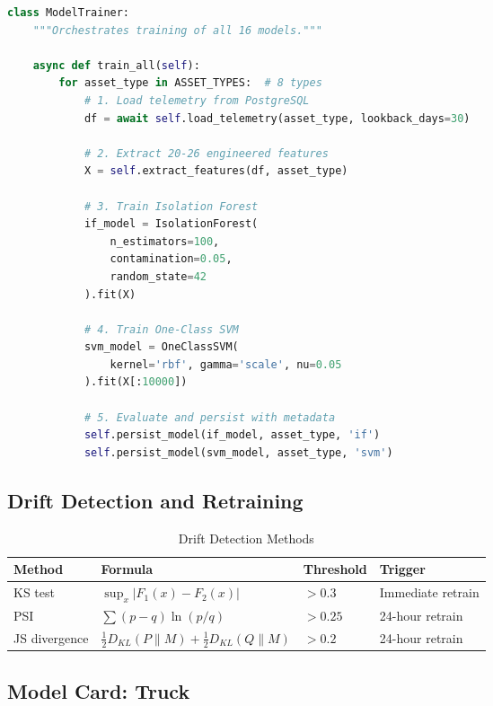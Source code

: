 \documentclass[12pt,a4paper]{amritareport}
\begin{document}
\begin{lstlisting}[language=Python, caption={ML training pipeline}]
class ModelTrainer:
    """Orchestrates training of all 16 models."""

    async def train_all(self):
        for asset_type in ASSET_TYPES:  # 8 types
            # 1. Load telemetry from PostgreSQL
            df = await self.load_telemetry(asset_type, lookback_days=30)

            # 2. Extract 20-26 engineered features
            X = self.extract_features(df, asset_type)

            # 3. Train Isolation Forest
            if_model = IsolationForest(
                n_estimators=100,
                contamination=0.05,
                random_state=42
            ).fit(X)

            # 4. Train One-Class SVM
            svm_model = OneClassSVM(
                kernel='rbf', gamma='scale', nu=0.05
            ).fit(X[:10000])

            # 5. Evaluate and persist with metadata
            self.persist_model(if_model, asset_type, 'if')
            self.persist_model(svm_model, asset_type, 'svm')
\end{lstlisting}

\subsection{Drift Detection and Retraining}

\begin{table}[H]
\centering
\caption{Drift Detection Methods}
\label{tab:drift}
\begin{tabular}{@{}llll@{}}
\toprule
\textbf{Method} & \textbf{Formula} & \textbf{Threshold} & \textbf{Trigger} \\
\midrule
KS test & $\sup_x |F_1(x) - F_2(x)|$ & $> 0.3$ & Immediate retrain \\
PSI & $\sum (p-q) \ln(p/q)$ & $> 0.25$ & 24-hour retrain \\
JS divergence & $\tfrac{1}{2} D_{KL}(P \| M) + \tfrac{1}{2} D_{KL}(Q \| M)$ & $> 0.2$ & 24-hour retrain \\
\bottomrule
\end{tabular}
\end{table}

\subsection{Model Card: Truck}
\end{document}

